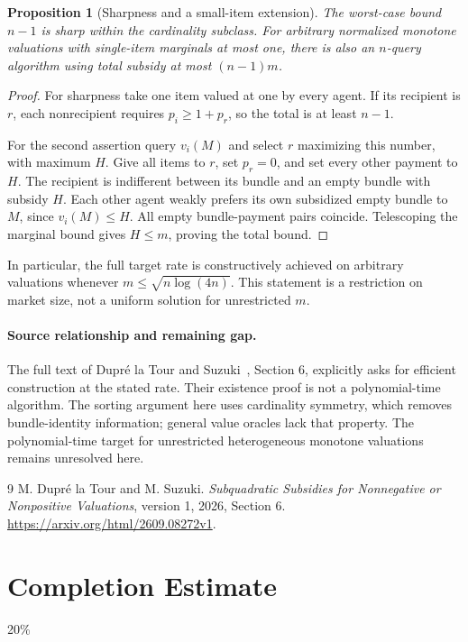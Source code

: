 \documentclass[11pt]{article}
\newtheorem{proposition}{Proposition}
\theoremstyle{definition}
\theoremstyle{remark}
\begin{document}
\begin{proposition}[Sharpness and a small-item extension]
The worst-case bound $n-1$ is sharp within the cardinality subclass. For arbitrary normalized monotone valuations with single-item marginals at most one, there is also an $n$-query algorithm using total subsidy at most $(n-1)m$.
\end{proposition}
\begin{proof}
For sharpness take one item valued at one by every agent. If its recipient is $r$, each nonrecipient requires $p_i\geq1+p_r$, so the total is at least $n-1$.

For the second assertion query $v_i(M)$ and select $r$ maximizing this number, with maximum $H$. Give all items to $r$, set $p_r=0$, and set every other payment to $H$. The recipient is indifferent between its bundle and an empty bundle with subsidy $H$. Each other agent weakly prefers its own subsidized empty bundle to $M$, since $v_i(M)\leq H$. All empty bundle-payment pairs coincide. Telescoping the marginal bound gives $H\leq m$, proving the total bound.
\end{proof}

In particular, the full target rate is constructively achieved on arbitrary valuations whenever $m\leq\sqrt{n\log(4n)}$. This statement is a restriction on market size, not a uniform solution for unrestricted $m$.

\paragraph{Source relationship and remaining gap.}
The full text of Dupr\'e la Tour and Suzuki~\cite{source}, Section 6, explicitly asks for efficient construction at the stated rate. Their existence proof is not a polynomial-time algorithm. The sorting argument here uses cardinality symmetry, which removes bundle-identity information; general value oracles lack that property. The polynomial-time target for unrestricted heterogeneous monotone valuations remains unresolved here.

\begin{thebibliography}{9}
 M. Dupr\'e la Tour and M. Suzuki.
\emph{Subquadratic Subsidies for Nonnegative or Nonpositive Valuations}, version 1, 2026, Section 6.
\url{https://arxiv.org/html/2609.08272v1}.
\end{thebibliography}

\section{Completion Estimate}
20\%
\end{document}
